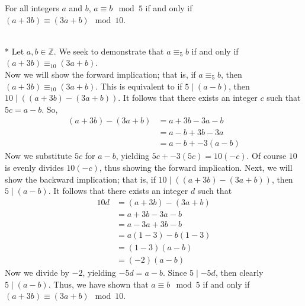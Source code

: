 \documentclass[10pt]{article}
\makeatletter
\newcommand{\Z}{\mathbb{Z}}
\newenvironment{question}[2][Question]{\begin{trivlist}
\item[\hskip \labelsep {\bfseries #1}\hskip \labelsep {\bfseries #2.}]}{\end{trivlist}}
\renewenvironment{proof}[1][\proofname]{\par
\pushQED{\qed}
\normalfont \topsep6\p@\@plus6\p@\relax
\trivlist
\item[\hskip\labelsep\itshape#1\@addpunct{.}]\mbox{}\\*}{\popQED\endtrivlist\@endpefalse}
\makeatother
\begin{document}
\begin{question}{4}
	For all integers $a$ and $b$, $a \equiv b \mod 5$ if and only if $(a + 3b) \equiv (3a + b) \mod 10$.
	\begin{proof}
		Let $a, b \in \Z$. We seek to demonstrate that $a \equiv_{5} b$ if and only if $(a + 3b) \equiv_{10} (3a + b)$. \\ Now we will show the forward implication; that is, if $a \equiv_{5} b$, then $(a + 3b) \equiv_{10} (3a + b)$.
		This is equivalent to if $5 \mid (a -b)$, then $10 \mid ((a+3b)- (3a +b))$.
		It follows that there exists an integer $c$ such that $5c = a - b$. So,
		\begin{align*}
			(a +3b) - (3a + b) & = a +3b - 3a - b      \\
			   & = a - b + 3b - 3a     \\
			   & = a - b + -3(a -b  )
		\end{align*}
		Now we substitute $5c$ for $a - b$, yielding $5c + -3(5c  ) = 10(-c)$. Of course $10$ is evenly divides $10(-c)$, thus showing the forward implication.
		Next, we will show the backward implication; that is, if $10 \mid ((a + 3b) - (3a + b))$, then $5 \mid (a -b)$.
		It follows that there exists an integer $d$ such that
		\begin{align*}
			10d & = (a + 3b) - (3a + b) \\
			    & = a + 3b  -3a - b     \\
			    & = a -3a + 3b   - b    \\
			    & = a(1 - 3) - b(1-3)   \\
			    & =  (1 - 3)(a- b)      \\
			    & =  (- 2)(a- b)
		\end{align*}
		Now we divide by $-2$, yielding $-5d= a- b$. Since $5 \mid -5d$, then clearly $5 \mid (a -b)$.
		Thus, we have shown that $a \equiv b \mod 5$ if and only if $(a + 3b) \equiv (3a + b) \mod 10$.
	\end{proof}
\end{question}

\newpage
\end{document}
